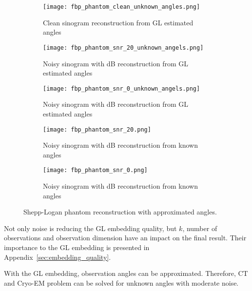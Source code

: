 \begin{figure}[H]
    \captionsetup[subfigure]{justification=centering}
    \centering
    \begin{subfigure}[t]{0.3\textwidth}
        \texttt{[image: fbp\_phantom\_clean\_unknown\_angles.png]}
        \caption{Clean sinogram reconstruction from GL estimated angles}
        \label{fig:clean_reco_unknown}
    \end{subfigure}\hfill
    \begin{subfigure}[t]{0.3\textwidth}
      \texttt{[image: fbp\_phantom\_snr\_20\_unknown\_angels.png]}
      \caption{Noisy sinogram with  dB reconstruction from GL estimated angles}
      \label{fig:noisy_snr20_reco_unknown}
    \end{subfigure}\hfill
    \begin{subfigure}[t]{0.3\textwidth}
      \texttt{[image: fbp\_phantom\_snr\_0\_unknown\_angels.png]}
      \caption{Noisy sinogram with  dB reconstruction from GL estimated angles}
      \label{fig:noisy_snr0_reco_unknown}
    \end{subfigure}

    \begin{subfigure}[t]{0.3\textwidth}
      \texttt{[image: fbp\_phantom\_snr\_20.png]}
      \caption{Noisy sinogram with  dB reconstruction from known angles}
      \label{fig:noisy_snr20_reco_known}
    \end{subfigure}\hfill
    \begin{subfigure}[t]{0.3\textwidth}
      \texttt{[image: fbp\_phantom\_snr\_0.png]}
      \caption{Noisy sinogram with  dB reconstruction from known angles}
      \label{fig:noisy_snr0_reco_known}
    \end{subfigure}

    \caption{Shepp-Logan phantom reconstruction with approximated angles.}
    \label{fig:phantom_fbp_unknown_angles}
  \end{figure}

  Not only noise is reducing the GL embedding quality, but $k$, number of observations 
  and observation dimension have an impact on the final result.
  Their importance to the GL embedding is presented in Appendix~\ref{sec:embedding_quality}.

  \begin{tcolorbox}[colback=red!5!white,colframe=red!75!black]
    With the GL embedding, observation angles can be approximated.
    Therefore, CT and Cryo-EM problem can be solved for unknown angles with moderate noise.
  \end{tcolorbox}

